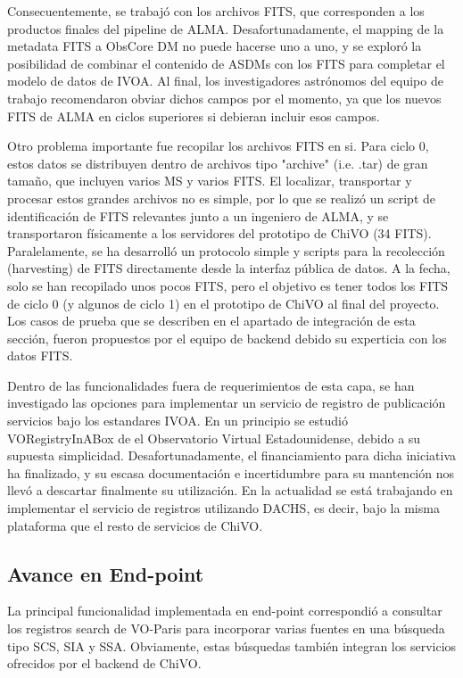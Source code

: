 Consecuentemente, se trabajó con los archivos FITS, que corresponden
a los productos finales del pipeline de ALMA. 
Desafortunadamente, el mapping de la metadata FITS a ObsCore DM no
puede hacerse uno a uno, y se exploró la posibilidad de combinar
el contenido de ASDMs con los FITS para completar el modelo
de datos de IVOA. Al final, los investigadores astrónomos del equipo
de trabajo recomendaron obviar dichos campos por el momento, ya que
los nuevos FITS de ALMA en ciclos superiores si debieran incluir esos campos.

Otro problema importante fue recopilar los archivos FITS en si.
Para ciclo 0, estos datos se distribuyen dentro de archivos tipo
"archive" (i.e. .tar) de gran tamaño, que incluyen varios MS y 
varios FITS. El localizar, transportar y procesar estos grandes archivos
no es simple, por lo que se realizó un script de identificación de FITS
relevantes junto a un ingeniero de ALMA, y se transportaron físicamente
a los servidores del prototipo de ChiVO (34 FITS). Paralelamente,
se ha desarrolló un protocolo simple y scripts para la recolección 
(harvesting) de FITS directamente desde la interfaz pública de datos.
A la fecha, solo se han recopilado unos pocos FITS, pero el objetivo
es tener todos los FITS de ciclo 0 (y algunos de ciclo 1) en el prototipo
de ChiVO al final del proyecto. Los casos de prueba que se describen en el apartado 
de integración de esta sección, fueron propuestos por el equipo de backend
debido su experticia con los datos FITS.

Dentro de las funcionalidades fuera de requerimientos de esta capa,
se han investigado las opciones para implementar un servicio de registro
de publicación servicios bajo los estandares IVOA. En un principio se estudió 
VORegistryInABox de el Observatorio Virtual Estadounidense, debido a su
supuesta simplicidad. Desafortunadamente, el financiamiento para dicha
iniciativa ha finalizado, y su escasa documentación e incertidumbre para
su mantención nos llevó a descartar finalmente su utilización.
En la actualidad se está trabajando en implementar el servicio de
registros utilizando DACHS, es decir, bajo la misma plataforma
que el resto de servicios de ChiVO.

\subsection{Avance en End-point}

La principal funcionalidad implementada en end-point correspondió 
a consultar los registros search de VO-Paris para incorporar
varias fuentes en una búsqueda tipo SCS, SIA y SSA. Obviamente,
estas búsquedas también integran los servicios ofrecidos por el backend
de ChiVO.

